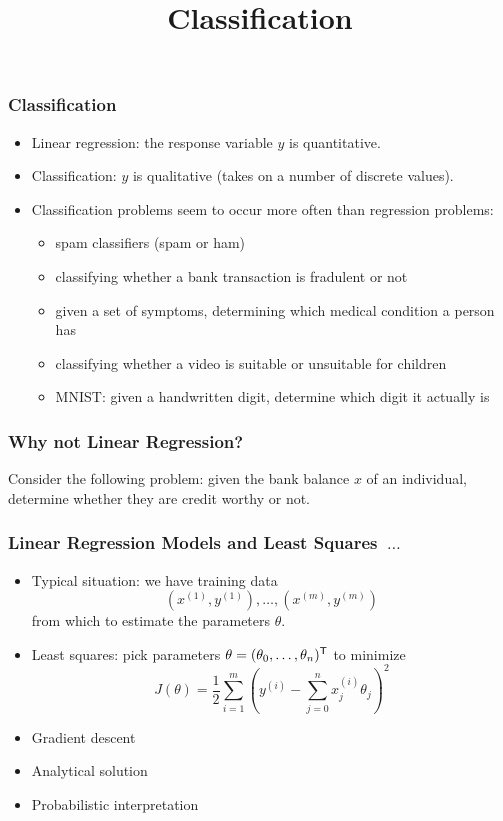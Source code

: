 \documentclass[xcolor=table]{beamer}
\title{Classification}
\newcommand{\trans}[1]{\ensuremath{#1}^{\scriptsize{\textsf{T}}}}
\begin{document}
\maketitle

\begin{frame}[t]
  \frametitle{Classification}  
\begin{itemize}
    \item Linear regression: the response variable $y$ is quantitative.
    \item Classification: $y$ is qualitative (takes on a number of discrete values).
    \item Classification problems seem to occur more often than regression problems:
		\begin{itemize}    
    		\item spam classifiers (spam or ham)
    		\item classifying whether a bank transaction is fradulent or not
    		\item given a set of symptoms, determining which medical condition a person has
    		\item classifying whether a video is suitable or unsuitable for children
    		\item MNIST: given a handwritten digit, determine which digit it actually is
    	\end{itemize} 
  \end{itemize}
\end{frame}


\begin{frame}[t]
\frametitle{Why not Linear Regression?}
Consider the following problem: given the bank balance $x$ of an individual, determine whether they are credit worthy or not.
\end{frame}

\begin{frame}[t]
\frametitle{Linear Regression Models and Least Squares~$\ldots$}
\begin{itemize}
    \item Typical situation: we have training data 
    \[(x^{(1)}, y^{(1)}), \ldots, (x^{(m)}, y^{(m)})\] 
    from which to estimate the parameters $\theta$.
    
    \item Least squares: pick parameters $\theta = \trans{(\theta_0, \ldots, \theta_n)}$ to minimize 
    \[J(\theta) = 
    \frac{1}{2} \sum_{i = 1}^{m} \left (y^{(i)} - \sum_{j = 0}^{n} x^{(i)}_j \theta_j \right )^2\]   
\end{itemize}

\pause

\begin{itemize}
    \item Gradient descent
    \item Analytical solution
    \item Probabilistic interpretation
\end{itemize}
\end{frame}
\end{document}
